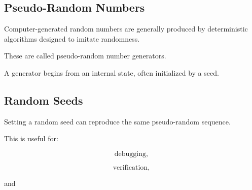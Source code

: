 
\subsection{Pseudo-Random Numbers}
\label{subsec:pseudorandom-numbers}

Computer-generated random numbers are generally produced by deterministic
algorithms designed to imitate randomness.

These are called pseudo-random number generators.

A generator begins from an internal state, often initialized by a seed.

\subsection{Random Seeds}
\label{subsec:random-seeds}

Setting a random seed can reproduce the same pseudo-random sequence.

This is useful for:

\[
\boxed{
\text{debugging},
}
\]

\[
\boxed{
\text{verification},
}
\]

and

